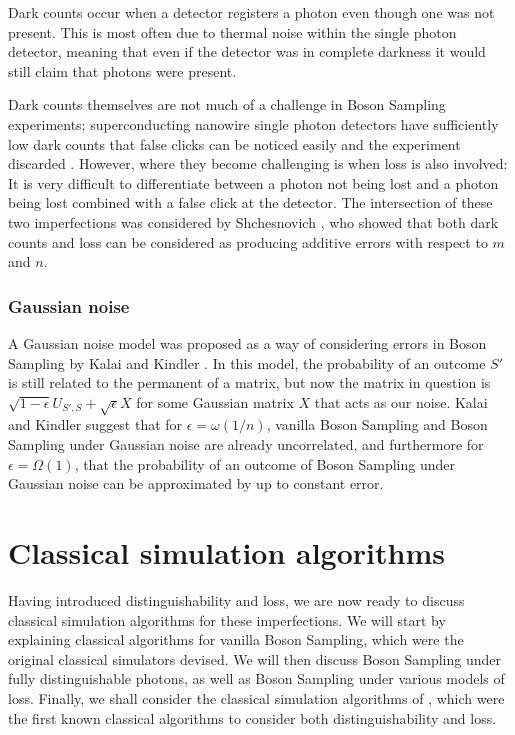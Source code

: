 Dark counts occur when a detector registers a photon even though one was not present. This is most often due to thermal noise within the single photon detector, meaning that even if the detector was in complete darkness it would still claim that photons were present.

Dark counts themselves are not much of a challenge in Boson Sampling experiments; superconducting nanowire single photon detectors have sufficiently low dark counts that false clicks can be noticed easily and the experiment discarded \cite{kitaygorsky2005}. However, where they become challenging is when loss is also involved: It is very difficult to differentiate between a photon not being lost and a photon being lost combined with a false click at the detector. The intersection of these two imperfections was considered by Shchesnovich \cite{shchesnovich2014darkcounts}, who showed that both dark counts and loss can be considered as producing additive errors with respect to $m$ and $n$.

\subsubsection{Gaussian noise}

A Gaussian noise model was proposed as a way of considering errors in Boson Sampling by Kalai and Kindler \cite{kalai2014}. In this model, the probability of an outcome $S'$ is still related to the permanent of a matrix, but now  the matrix in question is $\sqrt{1-\epsilon}U_{S',S}+\sqrt{\epsilon}X$ for some Gaussian matrix $X$ that acts as our noise. Kalai and Kindler suggest that for $\epsilon=\omega(1/n)$, vanilla Boson Sampling and Boson Sampling under Gaussian noise are already uncorrelated, and furthermore for $\epsilon = \Omega(1)$, that the probability of an outcome of Boson Sampling under Gaussian noise can be approximated by up to constant error.

\section{Classical simulation algorithms}
\label{sec:classical-simulations}

Having introduced distinguishability and loss, we are now ready to discuss classical simulation algorithms for these imperfections. We will start by explaining classical algorithms for vanilla Boson Sampling, which were the original classical simulators devised. We will then discuss Boson Sampling under fully distinguishable photons, as well as Boson Sampling under various models of loss. Finally, we shall consider the classical simulation algorithms of \cite{renema2018, renema2018loss}, which were the first known classical algorithms to consider both distinguishability and loss.


